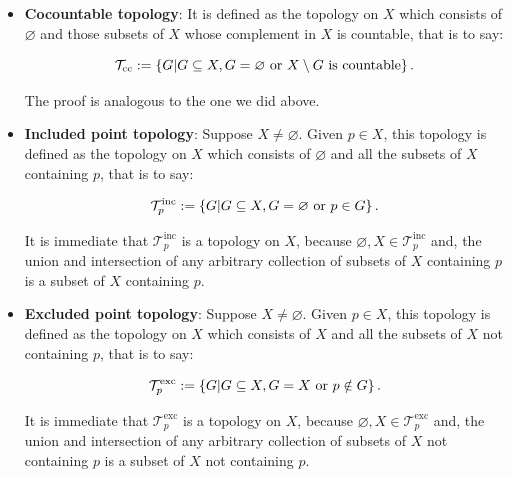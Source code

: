 \begin{example}
\begin{itemize}
      Lastly, let $\mathcal{G}\subseteq\mathcal{T}_{\text{cof}}$. If $\bigcup{\mathcal{G}}=\varnothing$, then there is nothing to prove. Suppose there exists a non-empty set $G_0\in\mathcal{G}$. Then $X\setminus\pr{\bigcup{\mathcal{G}}}=\bigcap_{G\in\mathcal{G}}{\pr{X\setminus G}}\subseteq X\setminus G_0$. As $X\setminus G_0$ is finite, we deduce that $X\setminus\pr{\bigcup_{G\in\mathcal{G}}{G}}$ is finite too. Thus $\bigcup{{\mathcal{G}}}\in\mathcal{T}_{\text{cof}}$. 
      
      Therefore, $\mathcal{T}_{\text{cof}}$ is a topology on $X$.
      \item \textbf{Cocountable topology}: It is defined as the topology on $X$ which consists of $\varnothing$ and those subsets of $X$ whose complement in $X$ is countable, that is to say:
      
      \begin{equation}
          \mathcal{T}_{\text{cc}}:=\left\{G\middle|G\subseteq X, G=\varnothing\text{ or }X\setminus G\text{ is countable}\right\}.
      \end{equation}

      The proof is analogous to the one we did above.
      \item \textbf{Included point topology}: Suppose $X\neq\varnothing$. Given $p\in X$, this topology is defined as the topology on $X$ which consists of $\varnothing$ and all the subsets of $X$ containing $p$, that is to say: 
      
      \begin{equation}
        \mathcal{T}_p^{\text{inc}}:=\left\{G\middle|G\subseteq X, G=\varnothing\text{ or }p\in G\right\}.
      \end{equation}
      
      It is immediate that $\mathcal{T}_p^{\text{inc}}$ is a topology on $X$, because $\varnothing,X\in\mathcal{T}_p^{\text{inc}}$ and, the union and intersection of any arbitrary collection of subsets of $X$ containing $p$ is a subset of $X$ containing $p$.
      \item \textbf{Excluded point topology}: Suppose $X\neq\varnothing$. Given $p\in X$, this topology is defined as the topology on $X$ which consists of $X$ and all the subsets of $X$ not containing $p$, that is to say: 
      
      \begin{equation}
        \mathcal{T}_p^{\text{exc}}:=\left\{G\middle|G\subseteq X, G=X\text{ or }p\notin G\right\}.
      \end{equation}
      
      It is immediate that $\mathcal{T}_p^{\text{exc}}$ is a topology on $X$, because $\varnothing,X\in\mathcal{T}_p^{\text{exc}}$ and, the union and intersection of any arbitrary collection of subsets of $X$ not containing $p$ is a subset of $X$ not containing $p$.
  \end{itemize}
\end{example}

